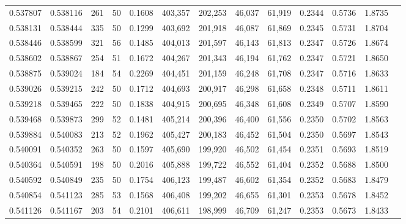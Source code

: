 \begin{tabular}{rrrrrrrrrrrrr}
0.537807 & 0.538116 &   261 &  50 &                                     0.1608 & 403,357 & 202,253 &  46,037 &  61,919 & 0.2344 & 0.5736 & 1.8735 \\
0.538131 & 0.538444 &   335 &  50 &                                     0.1299 & 403,692 & 201,918 &  46,087 &  61,869 & 0.2345 & 0.5731 & 1.8704 \\
0.538446 & 0.538599 &   321 &  56 &                                     0.1485 & 404,013 & 201,597 &  46,143 &  61,813 & 0.2347 & 0.5726 & 1.8674 \\
0.538602 & 0.538867 &   254 &  51 &                                     0.1672 & 404,267 & 201,343 &  46,194 &  61,762 & 0.2347 & 0.5721 & 1.8650 \\
0.538875 & 0.539024 &   184 &  54 &                                     0.2269 & 404,451 & 201,159 &  46,248 &  61,708 & 0.2347 & 0.5716 & 1.8633 \\
0.539026 & 0.539215 &   242 &  50 &                                     0.1712 & 404,693 & 200,917 &  46,298 &  61,658 & 0.2348 & 0.5711 & 1.8611 \\
0.539218 & 0.539465 &   222 &  50 &                                     0.1838 & 404,915 & 200,695 &  46,348 &  61,608 & 0.2349 & 0.5707 & 1.8590 \\
0.539468 & 0.539873 &   299 &  52 &                                     0.1481 & 405,214 & 200,396 &  46,400 &  61,556 & 0.2350 & 0.5702 & 1.8563 \\
0.539884 & 0.540083 &   213 &  52 &                                     0.1962 & 405,427 & 200,183 &  46,452 &  61,504 & 0.2350 & 0.5697 & 1.8543 \\
0.540091 & 0.540352 &   263 &  50 &                                     0.1597 & 405,690 & 199,920 &  46,502 &  61,454 & 0.2351 & 0.5693 & 1.8519 \\
0.540364 & 0.540591 &   198 &  50 &                                     0.2016 & 405,888 & 199,722 &  46,552 &  61,404 & 0.2352 & 0.5688 & 1.8500 \\
0.540592 & 0.540849 &   235 &  50 &                                     0.1754 & 406,123 & 199,487 &  46,602 &  61,354 & 0.2352 & 0.5683 & 1.8479 \\
0.540854 & 0.541123 &   285 &  53 &                                     0.1568 & 406,408 & 199,202 &  46,655 &  61,301 & 0.2353 & 0.5678 & 1.8452 \\
0.541126 & 0.541167 &   203 &  54 &                                     0.2101 & 406,611 & 198,999 &  46,709 &  61,247 & 0.2353 & 0.5673 & 1.8433 \\

\end{tabular}
